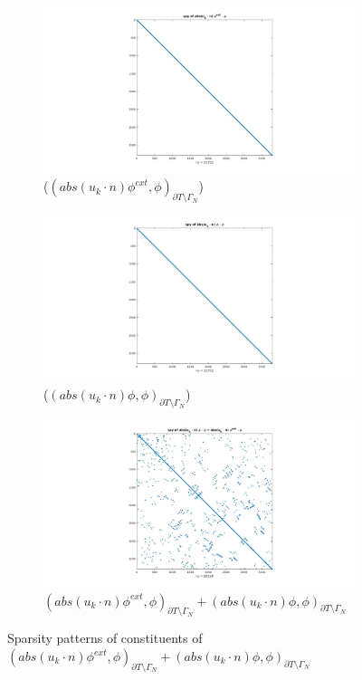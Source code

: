 \documentclass[a4paper,12pt]{book}
\begin{document}
\begin{figure}[H]
\begin{subfigure}{.5\textwidth}
\centering
  \includegraphics[width=\linewidth]{figure91.jpg}
  \caption{($(abs(u_k \cdot n)\phi^{ext},\phi)_{\partial T \setminus \Gamma_N}$)}
  \label{figure_91}
\end{subfigure}
\begin{subfigure}{.5\textwidth}	
\centering
  \includegraphics[width=\linewidth]{figure92.jpg}
  \caption{($(abs(u_k \cdot n)\phi,\phi)_{\partial T \setminus \Gamma_N}$)}
  \label{figure_92}
\end{subfigure}
\begin{subfigure}{\textwidth}	
\centering
  \includegraphics[width=\linewidth]{figure9.jpg}
  \caption{$(abs(u_k \cdot n)\phi^{ext},\phi)_{\partial T \setminus \Gamma_N} + (abs(u_k \cdot n)\phi,\phi)_{\partial T \setminus \Gamma_N}$}
  \label{figure_9}
\end{subfigure}
\caption{Sparsity patterns of constituents of $(abs(u_k \cdot n)\phi^{ext},\phi)_{\partial T \setminus \Gamma_N} + (abs(u_k \cdot n)\phi,\phi)_{\partial T \setminus \Gamma_N}$}
\label{figure_9_all}
\end{figure}
\end{document}
